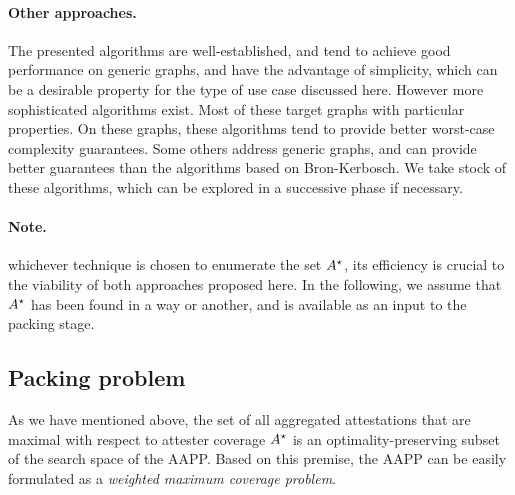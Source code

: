 \documentclass{article}
\begin{document}
\paragraph{Other approaches.}

The presented algorithms are well-established, and tend to achieve good performance
on generic graphs, and have the advantage of simplicity, which can be a
desirable property for the type of use case discussed here.
However more sophisticated algorithms exist.  Most of these target graphs with
particular properties. On these graphs, these algorithms tend to provide better
worst-case complexity guarantees.  Some others address generic graphs, and can
provide better guarantees than the algorithms based on Bron-Kerbosch. We take
stock of these algorithms, which can be explored in a successive phase if
necessary.

\paragraph{Note.} whichever technique is chosen to enumerate the set
$A^{\star}$, its efficiency is crucial to the viability of both
approaches proposed here. In the following, we assume that
$A^{\star}$ has been found in a way or another, and is available as
an input to the packing stage.

\subsection{Packing problem} \label{sec:coverage}

As we have mentioned above, the set of all aggregated attestations that are
maximal with respect to attester coverage $A^{\star}$ is an
optimality-preserving subset of the search space of the AAPP. 
%
\newcommand{\weight}[1]{\ensuremath{w(#1)}}
%
Based on this premise, the AAPP can be easily formulated as a \emph{weighted
maximum coverage problem}. 
\end{document}
